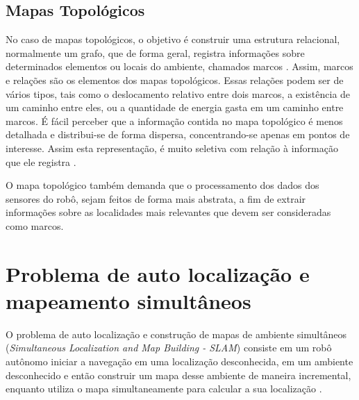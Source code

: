 \subsection{Mapas Topológicos}
No caso de mapas topológicos, o objetivo é construir uma estrutura relacional, normalmente um grafo, 
que de forma geral, registra informações sobre determinados
elementos ou locais do ambiente, chamados marcos \cite{construcaoMapas2}. 
Assim, marcos e relações são os elementos dos mapas topológicos.
Essas relações podem ser de vários tipos, tais como o deslocamento
relativo entre dois marcos, a existência de um caminho entre eles,
ou a quantidade de energia gasta em um caminho entre marcos. 
É fácil perceber que a informação contida no mapa topológico é
menos detalhada e distribui-se de forma dispersa, concentrando-se apenas em pontos de interesse.
Assim esta representação, é muito seletiva com relação à informação que ele registra \cite{construcaoMapas2}. 

O mapa topológico também demanda que o processamento
dos dados dos sensores do robô, sejam feitos de forma mais abstrata, 
a fim de extrair informações sobre as localidades mais relevantes que devem ser consideradas
como marcos.

\section{Problema de auto localização e mapeamento simultâneos}
  O problema de auto localização e construção de mapas de ambiente simultâneos (\textit{Simultaneous Localization and
Map Building - SLAM}) consiste em um robô autônomo iniciar a navegação
em uma localização desconhecida, em um ambiente desconhecido e então construir um mapa
desse ambiente de maneira incremental, enquanto utiliza o mapa simultaneamente para calcular a sua localização \cite{slam}.
 
